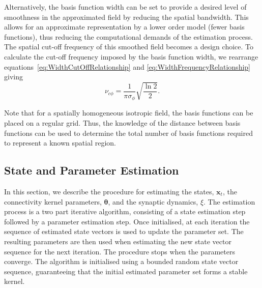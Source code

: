 \documentclass[12pt]{iopart}
\begin{document}
Alternatively, the basis function width can be set to provide a desired level of smoothness in the approximated field by reducing the spatial bandwidth. This allows for an approximate representation by a lower order model (fewer basis functions), thus reducing the computational demands of the estimation process. The spatial cut-off frequency of this smoothed field becomes a design choice. To calculate the cut-off frequency imposed by the basis function width, we rearrange equations~\ref{eq:WidthCutOffRelationship} and \ref{eq:WidthFrequencyRelationship} giving
\begin{equation}\label{eq:CutoffFromBasisFuncWidth}
	\nu_{c\phi}=\frac{1}{\pi\sigma_{\phi}}\sqrt{\frac{\ln2}{2}}.
\end{equation} 

Note that for a spatially homogeneous isotropic field, the basis functions can be placed on a regular grid. Thus, the knowledge of the distance between basis functions can be used to determine the total number of basis functions required to represent a known spatial region.

\subsection{State and Parameter Estimation}\label{StateAndParameterEstimationSection} In this section, we describe the procedure for estimating the states, $\mathbf{x}_t$, the connectivity kernel parameters, $\boldsymbol \theta$, and the synaptic dynamics, $\xi$. The estimation process is a two part iterative algorithm, consisting of a state estimation step followed by a parameter estimation step. Once initialised, at each iteration the sequence of estimated state vectors is used to update the parameter set. The resulting parameters are then used when estimating the new state vector sequence for the next iteration. The procedure stops when the parameters converge. The algorithm is initialised using a bounded random state vector sequence, guaranteeing that the initial estimated parameter set forms a stable kernel.
\end{document}
